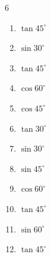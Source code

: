 \begin{multicols}{6}
\begin{enumerate}

  \item $\displaystyle \tan{45^\circ}$

        \phantom{$\displaystyle =1$}

  \item $\displaystyle \sin{30^\circ}$


  \item $\displaystyle \tan{45^\circ}$

        \phantom{$\displaystyle =1$}

\columnbreak %

  \item $\displaystyle \cos{60^\circ}$


  \item $\displaystyle \cos{45^\circ}$


  \item $\displaystyle \tan{30^\circ}$


  \item $\displaystyle \sin{30^\circ}$


  \item $\displaystyle \sin{45^\circ}$


  \item $\displaystyle \cos{60^\circ}$


  \item $\displaystyle \tan{45^\circ}$

        \phantom{$\displaystyle =1$}

  \item $\displaystyle \sin{60^\circ}$


  \item $\displaystyle \tan{45^\circ}$

        \phantom{$\displaystyle =1$}


\end{enumerate}
\end{multicols}
